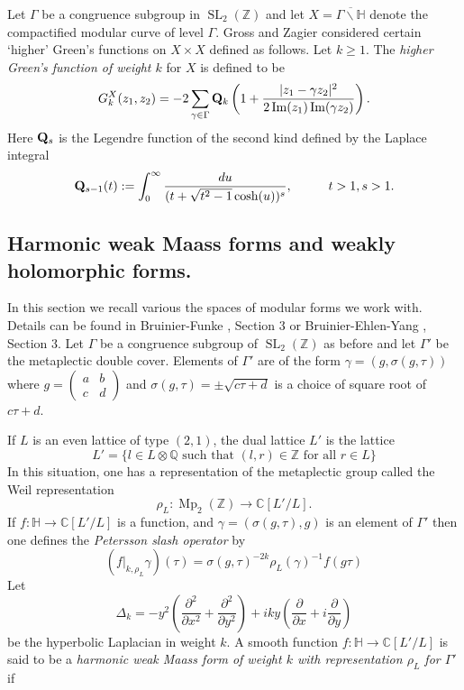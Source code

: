 \documentclass[11pt,a4paper]{article}
\newcommand {\ZZ}{{\mathds Z}}
\newcommand {\C}{{\mathds C}}
\newcommand {\Q}{{\mathds Q}}
\newcommand {\QQ}{{\bf Q}}
\newcommand {\HH}{{\mathds H}}
\def\Im{\operatorname{Im}}
\DeclareMathOperator{\SL}{SL}
\DeclareMathOperator{\Mp}{Mp}
\begin{document}
Let $\Gamma$ be a congruence subgroup in $\SL_2(\mathbb{Z})$ and let $X=\overline{\Gamma\backslash \HH}$ denote the compactified modular curve of level $\Gamma$. Gross and Zagier \cite{grza} considered certain  `higher' Green's functions on $X \times X$ defined as follows. Let $k\geq 1$. The {\em higher Green's function of weight $k$} for $X$ is defined to be
%
$$
G^X_{k}(z_1,z_2)=-2 \sum_{\gamma \in \Gamma} \QQ_{k} \left( 1+\frac{|z_1-\gamma z_2|^2}{2 \Im(z_1) \Im(\gamma z_2)}\right).
$$
%
Here $\QQ_s$ is the Legendre function of the second kind defined by the Laplace integral 
%
$$
\QQ_{s-1}(t):=\int_0^{\infty} \frac{du}{(t+\sqrt{t^2-1} \cosh(u))^{s}}, \hspace {1cm} t>1,s>1.
$$
%



\iffalse


\subsection{Harmonic weak Maass forms and weakly holomorphic forms.}

In this section we recall various the spaces of modular forms we work with. Details can be found in Bruinier-Funke \cite{brfu}, Section 3 or Bruinier-Ehlen-Yang \cite{BEY}, Section 3. Let $\Gamma$ be a congruence subgroup of $\SL_2(\ZZ)$ as before and let $\Gamma'$ be the metaplectic double cover. Elements of $\Gamma'$ are of the form $\gamma=(g,\sigma(g,\tau))$ where $g=\begin{pmatrix} a & b \\ c & d \end{pmatrix}$ and $\sigma(g,\tau)=\pm \sqrt{c\tau+d}$ is a choice of square root of $c\tau + d$.
	
If $L$ is an even lattice of type $(2,1)$, the dual lattice $L'$ is the lattice 
%
$$L'=\{l \in L \otimes \Q \text{ such that } (l,r) \in \ZZ \text{ for all } r \in L\}$$
%
In this situation, one has a representation of the metaplectic group called  the Weil representation 
%
$$\rho_L:\Mp_2(\ZZ) \longrightarrow \C[L'/L].$$
%
If $f:\HH \longrightarrow \C[L'/L]$ is a function, and $\gamma=(\sigma(g,\tau),g)$ is an element of $\Gamma'$ then one defines the {\em Petersson slash operator} by 
%
$$(f|_{k,\rho_L} \gamma)(\tau)= \sigma(g,\tau)^{-2k} \rho_L(\gamma)^{-1} f(g\tau)$$
%
Let 
%
$$\Delta_k=-y^2 \left(\frac{\partial^2}{\partial x^2}+ \frac{\partial^2}{\partial y^2}\right) + iky \left( \frac{\partial}{\partial x}+ i\frac{\partial}{\partial y}\right)$$
%
be the hyperbolic Laplacian in weight $k$. A smooth function $f: \HH \longrightarrow \C[L'/L]$ is said to be a {\em harmonic weak Maass form of weight $k$ with representation $\rho_L$ for $\Gamma'$} if 
\end{document}
